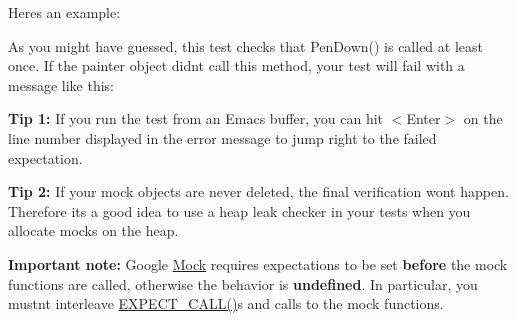 Here\textquotesingle{}s an example\+:


\begin{DoxyCode}{0}
\DoxyCodeLine{}
\DoxyCodeLine{}
\DoxyCodeLine{}
\DoxyCodeLine{}
\DoxyCodeLine{\}}
\end{DoxyCode}


As you might have guessed, this test checks that {\ttfamily Pen\+Down()} is called at least once. If the {\ttfamily painter} object didn\textquotesingle{}t call this method, your test will fail with a message like this\+:


\begin{DoxyCode}{0}
\end{DoxyCode}


{\bfseries{Tip 1\+:}} If you run the test from an Emacs buffer, you can hit {\ttfamily $<$Enter$>$} on the line number displayed in the error message to jump right to the failed expectation.

{\bfseries{Tip 2\+:}} If your mock objects are never deleted, the final verification won\textquotesingle{}t happen. Therefore it\textquotesingle{}s a good idea to use a heap leak checker in your tests when you allocate mocks on the heap.

{\bfseries{Important note\+:}} Google \mbox{\hyperlink{class_mock}{Mock}} requires expectations to be set {\bfseries{before}} the mock functions are called, otherwise the behavior is {\bfseries{undefined}}. In particular, you mustn\textquotesingle{}t interleave {\ttfamily \mbox{\hyperlink{googletest-master_2googlemock_2include_2gmock_2gmock-spec-builders_8h_a535a6156de72c1a2e25a127e38ee5232}{E\+X\+P\+E\+C\+T\+\_\+\+C\+A\+L\+L()}}}s and calls to the mock functions.

